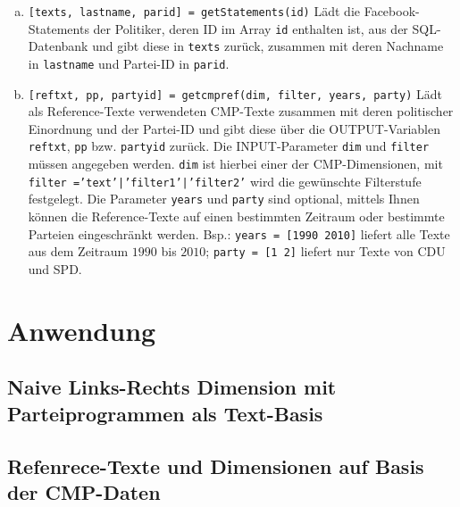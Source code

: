 \begin{enumerate}[(a)]
\item \label{getStatements} \texttt{[texts, lastname, parid] = getStatements(id)} \newline
    Lädt die Facebook-Statements der Politiker, deren ID im Array \texttt{id} enthalten ist, aus der SQL-Datenbank und gibt diese in \texttt{texts} zurück, zusammen mit deren Nachname in \texttt{lastname} und Partei-ID in \texttt{parid}.

\item \label{getcmpref} \texttt{[reftxt, pp, partyid] = getcmpref(dim, filter, years, party)} \newline
    Lädt als Reference-Texte verwendeten CMP-Texte zusammen mit deren politischer Einordnung und der Partei-ID und gibt diese über die OUTPUT-Variablen \texttt{reftxt}, \texttt{pp} bzw. \texttt{partyid} zurück. Die INPUT-Parameter \texttt{dim} und \texttt{filter} müssen angegeben werden. \texttt{dim} ist hierbei einer der CMP-Dimensionen, mit \texttt{filter =}\linebreak\texttt{'text'|'filter1'|'filter2'} wird die gewünschte Filterstufe festgelegt. Die Parameter \texttt{years} und \texttt{party} sind optional, mittels Ihnen können die Reference-Texte auf einen bestimmten Zeitraum oder bestimmte Parteien eingeschränkt werden. Bsp.: \texttt{years = [1990 2010]} liefert alle Texte aus dem Zeitraum $1990$ bis $2010$; \texttt{party = [1 2]} liefert nur Texte von CDU und SPD.



   
\end{enumerate}


\section{Anwendung}
    \subsection{Naive Links-Rechts Dimension mit Parteiprogrammen als Text-Basis}
    \subsection{Refenrece-Texte und Dimensionen auf Basis der CMP-Daten}

